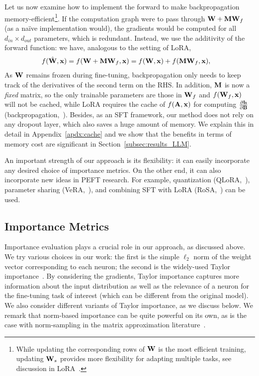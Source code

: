 Let us now examine how to implement the forward to make backpropagation memory-efficient\footnote{While updating the corresponding rows of ${\mathbf{W}}$ is the most efficient training, updating ${\mathbf{W}}_s$ provides more flexibility for adapting multiple tasks, see discussion in LoRA~\cite{hulora}.}. If the computation graph were to pass through ${\mathbf{W}} + {\mathbf{M}} {\mathbf{W}}_f$ (as a na\"ive implementation would), the gradients would be computed for all $d_{in} \times d_{out}$ parameters, which is redundant. Instead, we use the additivity of the forward function: we have, analogous to the setting of LoRA,
\begin{align}
    f(\hat{{\mathbf{W}}},{\mathbf{x}})&= f({\mathbf{W}} + {\mathbf{M}}{\mathbf{W}}_f,{\mathbf{x}}) =  f({\mathbf{W}},{\mathbf{x}}) +  f({\mathbf{M}}{\mathbf{W}}_f,{\mathbf{x}}),\label{eq:SPruFT_fwd}
\end{align}
As ${\mathbf{W}}$ remains frozen during fine-tuning, backpropagation only needs to keep track of the derivatives of the second term on the RHS. In addition, ${\mathbf{M}}$ is now a \emph{fixed} matrix, so the only trainable parameters are those in ${\mathbf{W}}_f$ and $f({\mathbf{W}}_f,{\mathbf{x}})$ will not be cached, while LoRA requires the cache of $f({\mathbf{A}},{\mathbf{x}})$ for computing $\frac{\partial {\mathbf{h}}}{\partial {\mathbf{B}}}$ (backpropagation,~\citealt{rumelhart1986learning}). Besides, as an SFT framework, our method does not rely on any dropout layer, which also saves a huge amount of memory. We explain this in detail in Appendix~\ref{apdx:cache} and we show that the benefits in terms of memory cost are significant in Section~\ref{subsec:results_LLM}. 

An important strength of our approach is its flexibility: it can easily incorporate any desired choice of importance metrics. On the other end, it can also incorporate new ideas in PEFT research. For example, quantization (QLoRA,~\citealt{dettmers2024qlora}), parameter sharing (VeRA,~\citealt{kopiczko2024vera}), and combining SFT with LoRA (RoSA,~\citealt{nikdan2024rosa}) can be used. 

\subsection{Importance Metrics} \label{subsec:importance}

Importance evaluation plays a crucial role in our approach, as discussed above. We try various choices in our work: the first is the simple $\ell_2$ norm of the weight vector corresponding to each neuron; the second is the widely-used Taylor importance~\citep{lecun1989optimal}. By considering the gradients, Taylor importance captures more information about the input distribution as well as the relevance of a neuron for the fine-tuning task of interest (which can be different from the original model). We also consider different variants of Taylor importance, as we discuss below. We remark that norm-based importance can be quite powerful on its own, as is the case with norm-sampling in the matrix approximation literature~\citep{frieze-kannan}. %

